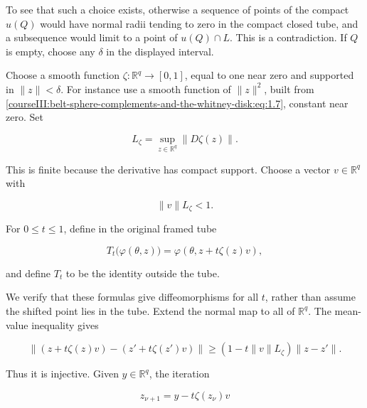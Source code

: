 To see that such a choice exists, otherwise a sequence of points of the compact \(u(Q)\) would have normal radii tending to zero in the compact closed tube, and a subsequence would limit to a point of \(u(Q)\cap L\). This is a contradiction. If \(Q\) is empty, choose any \(\delta\) in the displayed interval.

Choose a smooth function \(\zeta:\mathbb R^q\to[0,1]\), equal to one near zero and supported in \(\|z\|<\delta\). For instance use a smooth function of \(\|z\|^2\), built from \eqref{courseIII:belt-sphere-complements-and-the-whitney-disk:eq:1.7}, constant near zero. Set

\begin{equation}
L_\zeta=\sup_{z\in\mathbb R^q}\|D\zeta(z)\|.
\label{courseIII:belt-sphere-complements-and-the-whitney-disk:eq:2.2}
\end{equation}

This is finite because the derivative has compact support. Choose a vector \(v\in\mathbb R^q\) with

\begin{equation}
\|v\|L_\zeta<1.
\label{courseIII:belt-sphere-complements-and-the-whitney-disk:eq:2.3}
\end{equation}

For \(0\leq t\leq1\), define in the original framed tube

\begin{equation}
T_t\bigl(\varphi(\theta,z)\bigr)
=\varphi(\theta,z+t\zeta(z)v),
\label{courseIII:belt-sphere-complements-and-the-whitney-disk:eq:2.4}
\end{equation}

and define \(T_t\) to be the identity outside the tube.

We verify that these formulas give diffeomorphisms for all \(t\), rather than assume the shifted point lies in the tube. Extend the normal map to all of \(\mathbb R^q\). The mean-value inequality gives

\begin{equation}
\|(z+t\zeta(z)v)-(z'+t\zeta(z')v)\|
\geq(1-t\|v\|L_\zeta)\|z-z'\|.
\label{courseIII:belt-sphere-complements-and-the-whitney-disk:eq:2.5}
\end{equation}

Thus it is injective. Given \(y\in\mathbb R^q\), the iteration

\begin{equation}
z_{\nu+1}=y-t\zeta(z_\nu)v
\label{courseIII:belt-sphere-complements-and-the-whitney-disk:eq:2.6}
\end{equation}

